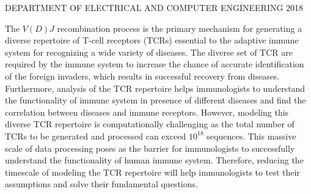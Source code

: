 \documentclass[dissertation,copyright]{uathesis}
\begin{document}
\maketitlepage
{DEPARTMENT OF ELECTRICAL AND COMPUTER ENGINEERING}	%
{2018}							
  





\tableofcontents

\listoffigures

\listoftables


The $V(D)J$ recombination process is the primary mechanism for generating a diverse repertoire of T-cell receptors (TCRs) essential to the adaptive immune system for recognizing a wide variety of diseases. The diverse set of TCR are required by the immune system to increase the chance of accurate identification of the foreign invaders, which results in successful recovery from diseases. Furthermore, analysis of the TCR repertoire helps immunologists to understand the functionality of immune system in presence of different diseases and find the correlation between diseases and immune receptors. However, modeling this diverse TCR repertoire is computationally challenging as the total number of TCRs to be generated and processed can exceed $10^{18}$ sequences. This massive scale of data processing poses as the barrier for immunologists to successfully understand the functionality of human immune system. Therefore, reducing the timescale of modeling the TCR repertoire will help immunologists to test their assumptions and solve their fundamental questions. 
\end{document}
